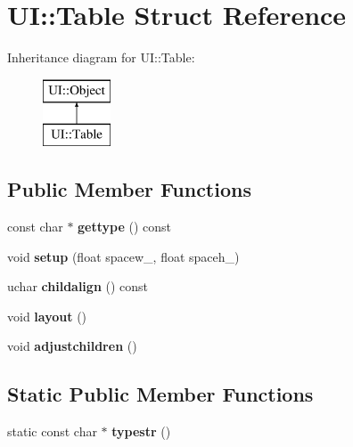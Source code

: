 \hypertarget{struct_u_i_1_1_table}{}\section{UI\+:\+:Table Struct Reference}
\label{struct_u_i_1_1_table}
Inheritance diagram for UI\+:\+:Table\+:\begin{figure}[H]
\begin{center}
\leavevmode
\includegraphics[height=2.000000cm]{struct_u_i_1_1_table}
\end{center}
\end{figure}
\subsection*{Public Member Functions}
\begin{DoxyCompactItemize}
\item 
\mbox{\label{struct_u_i_1_1_table_a5db03fc82a60cfd1c7a43306197d7f25}} 
const char $\ast$ {\bfseries gettype} () const
\item 
\mbox{\label{struct_u_i_1_1_table_a85d54a9751f01559d336b6f6c0627d7d}} 
void {\bfseries setup} (float spacew\+\_, float spaceh\+\_)
\item 
\mbox{\label{struct_u_i_1_1_table_afaf53f44c4a6adef3b10eb07f54d2643}} 
uchar {\bfseries childalign} () const
\item 
\mbox{\label{struct_u_i_1_1_table_aa10099ff954451eee03d0fe09e69a172}} 
void {\bfseries layout} ()
\item 
\mbox{\label{struct_u_i_1_1_table_ab81287039bc10c26173dfcd08f5014c6}} 
void {\bfseries adjustchildren} ()
\end{DoxyCompactItemize}
\subsection*{Static Public Member Functions}
\begin{DoxyCompactItemize}
\item 
\mbox{\label{struct_u_i_1_1_table_aadbb1e6fa6dea1da97d64fc66c54c456}} 
static const char $\ast$ {\bfseries typestr} ()
\end{DoxyCompactItemize}
